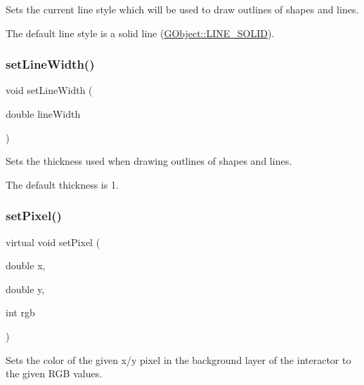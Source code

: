Sets the current line style which will be used to draw outlines of shapes and lines. 

The default line style is a solid line (\mbox{\hyperlink{classGObject_a86e0f5648542856159bb40775c854aa7a700c78bc2cd76acaab26651bf7b4941f}{G\+Object\+::\+L\+I\+N\+E\+\_\+\+S\+O\+L\+ID}}). \mbox{\label{classGDrawingSurface_afd6a47c6ea6a1f85ca05a65ba3ff3477}} 
\subsubsection{\texorpdfstring{set\+Line\+Width()}{setLineWidth()}}
{\footnotesize\ttfamily void set\+Line\+Width (\begin{DoxyParamCaption}\item[{double}]{line\+Width }\end{DoxyParamCaption})\hspace{0.3cm}{\ttfamily [virtual]}}



Sets the thickness used when drawing outlines of shapes and lines. 

The default thickness is 1. \mbox{\label{classGDrawingSurface_ac9f0a75ccb0abe1123046bab56479b84}} 
\subsubsection{\texorpdfstring{set\+Pixel()}{setPixel()}\hspace{0.1cm}{\footnotesize\ttfamily [1/3]}}
{\footnotesize\ttfamily virtual void set\+Pixel (\begin{DoxyParamCaption}\item[{double}]{x,  }\item[{double}]{y,  }\item[{int}]{rgb }\end{DoxyParamCaption})\hspace{0.3cm}{\ttfamily [pure virtual]}}



Sets the color of the given x/y pixel in the background layer of the interactor to the given R\+GB values. 

